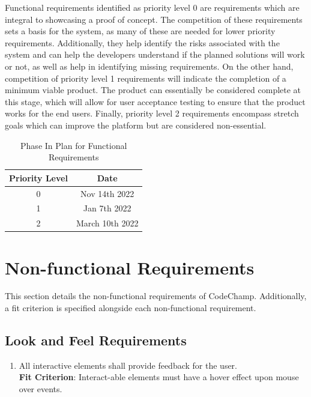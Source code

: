 \documentclass[12pt, titlepage]{article}
\begin{document}
Functional requirements identified as priority level 0 are requirements which are integral to showcasing a proof of concept. The competition of these requirements sets a basis for the system, as many of these are needed for lower priority requirements. Additionally, they help identify the risks associated with the system and can help the developers understand if the planned solutions will work or not, as well as help in identifying missing requirements. On the other hand, competition of priority level 1 requirements will indicate the completion of a minimum viable product. The product can essentially be considered complete at this stage, which will allow for user acceptance testing to ensure that the product works for the end users. Finally, priority level 2 requirements encompass stretch goals which can improve the platform but are considered non-essential.

\begin{table}[h]
\begin{center}
\begin{tabular}{|c|c|}
\hline
    Priority Level & Date \\
    \hline
    0 & Nov 14th 2022 \\
    1 & Jan 7th 2022 \\
    2 & March 10th 2022 \\
    \hline
\end{tabular}
\end{center}
\caption{Phase In Plan for Functional Requirements}            

\end{table}


\section{Non-functional Requirements}

This section details the non-functional requirements of CodeChamp. Additionally, a fit criterion is specified alongside each non-functional requirement.


\subsection{Look and Feel Requirements}
\begin{enumerate}[label=NFR.\arabic*]
    \item All interactive elements shall provide feedback for the user. \label{NFR.1}
    \\\textbf{Fit Criterion}: Interact-able elements must have a hover effect upon mouse over events.
\end{enumerate}
\end{document}
